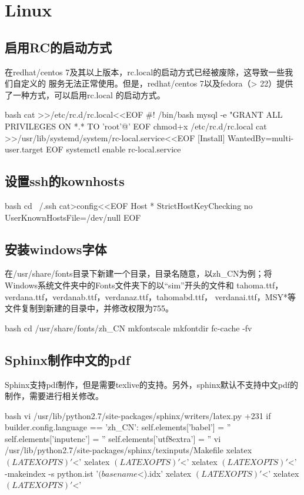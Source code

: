 \chapter{Linux}

\section{启用RC的启动方式}
在redhat/centos 7及其以上版本，rc.local的启动方式已经被废除，这导致一些我们自定义的
服务无法正常使用。但是，redhat/centos 7以及fedora（> 22）提供了一种方式，可以启用rc.local
的启动方式。
\begin{code-block}{bash}
cat >>/etc/rc.d/rc.local<<EOF
#! /bin/bash
mysql -e  "GRANT ALL PRIVILEGES ON *.* TO 'root'@'%
EOF
chmod+x /etc/rc.d/rc.local
cat >>/usr/lib/systemd/system/rc-local.service<<EOF
[Install]
WantedBy=multi-user.target
EOF
systemctl enable rc-local.service
\end{code-block}

\section{设置ssh的kownhosts}
\begin{code-block}{bash}
cd ~/.ssh
cat>config<<EOF
Host *
    StrictHostKeyChecking no
    UserKnownHostsFile=/dev/null
EOF
\end{code-block}

\section{安装windows字体}
在/usr/share/fonts目录下新建一个目录，目录名随意，以zh\_CN为例；将Windows系统文件夹中的Fonts文件夹下的以“sim”开头的文件和
tahoma.ttf，verdana.ttf，verdanab.ttf，verdanaz.ttf，tahomabd.ttf，
verdanai.ttf，MSY*等文件复制到新建的目录中，并修改权限为755。
\begin{code-block}{bash}
cd /usr/share/fonts/zh_CN
mkfontscale
mkfontdir
fc-cache -fv
\end{code-block}

\section{Sphinx制作中文的pdf}
Sphinx支持pdf制作，但是需要texlive的支持。另外，sphinx默认不支持中文pdf的制作，需要进行相关修改。
\begin{code-block}{bash}
vi /usr/lib/python2.7/site-packages/sphinx/writers/latex.py +231
            if builder.config.language == 'zh_CN':
                self.elements['babel'] = ''
                self.elements['inputenc'] = ''
                self.elements['utf8extra'] = ''
vi /usr/lib/python2.7/site-packages/sphinx/texinputs/Makefile
        xelatex $(LATEXOPTS) '$<'
        xelatex $(LATEXOPTS) '$<'
        xelatex $(LATEXOPTS) '$<'
        -makeindex -s python.ist '$(basename $<).idx'
        xelatex $(LATEXOPTS) '$<'
        xelatex $(LATEXOPTS) '$<'
\end{code-block}

